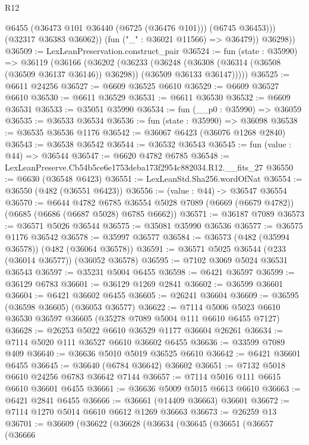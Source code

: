 \begin{lexlean}{R12}
\begin{coremodule}
                @6455
                (@36473 @101 @36440 (@6725 (@36476 @101)))
                (@6745 @36453)))
            (@32317 @36383 @36062))
          (fun ("_" : @36021 @11566) => @36479))
        @36298))
@36509 := LexLeanPreservation.construct_pair
@36524 := fun (state : @35990) =>
  @36119
    (@36166
      (@36202
        (@36233
          (@36248
            (@36308 (@36314 (@36508 (@36509 @36137 @36146)) @36298))
            (@36509 @36133 @36147)))))
@36525 := @6611 @24256
@36527 := @6609 @36525 @6610
@36529 := @6609 @36527 @6610
@36530 := @6611 @36529
@36531 := @6611 @36530
@36532 := @6609 @36531
@36533 := @35051 @35990
@36534 := fun (__p0 : @35990) => @36059
@36535 := @36533 @36534
@36536 := fun (state : @35990) => @36098
@36538 := @36535 @36536 @1176
@36542 := @36067 @6423 (@36076 @1268 @2840)
@36543 := @36538 @36542
@36544 := @36532 @36543
@36545 := fun (value : @44) => @36544
@36547 := @6620 @4782 @6785
@36548 := LexLeanPreserve.Cb54b5ce6e1753deba173f2954c882034.R12.__fits_27
@36550 := @6630 (@36548 @6423)
@36551 := LexLeanStd.Sha256.wordOfNat
@36554 := @36550 (@482 (@36551 @6423))
@36556 := (value : @44) -> @36547 @36554
@36570 := @6644
    @4782
    @6785
    @36554
    @5028
    @7089
    (@6669 (@6679 @4782))
    (@6685 (@6686 (@6687 @5028) @6785 @6662))
@36571 := @36187 @7089
@36573 := @36571 @5026 @36544
@36575 := @35081 @35990 @36536
@36577 := @36575 @1176 @36542
@36578 := @35997 @36577
@36584 := @36573 (@482 (@35994 @36578)) (@482 (@36064 @36578))
@36591 := @36571 @5025 @36544 (@233 (@36014 @36577)) (@36052 @36578)
@36595 := @7102 @3069 @5024 @36531 @36543
@36597 := @35231 @5004 @6455
@36598 := @6421 @36597
@36599 := @36129 @6783
@36601 := @36129 @1269 @2841
@36602 := @36599 @36601
@36604 := @6421 @36602 @6455
@36605 := @26241 @36604
@36609 := @36595 (@36598 @36605) (@36053 @36577)
@36622 := @7114 @5006 @5023 @6610 @36530 @36597 @36605 (@35278 @7089 @5004 @111 @6610 @6455 @7127)
@36628 := @26253 @5022 @6610 @36529 @1177 @36604 @26261
@36634 := @7114 @5020 @111 @36527 @6610 @36602 @6455
@36636 := @33599 @7089 @409
@36640 := @36636 @5010 @5019 @36525 @6610
@36642 := @6421 @36601 @6455
@36645 := @36640 (@6784 @36642) @36602
@36651 := @7132 @5018 @6610 @24256 @6783 @36642 @7144
@36657 := @7114 @5016 @111 @6615 @6610 @36601 @6455
@36661 := @36636 @5009 @5015 @6613 @6610
@36663 := @6421 @2841 @6455
@36666 := @36661 (@14409 @36663) @36601
@36672 := @7114 @1270 @5014 @6610 @6612 @1269 @36663
@36673 := @26259 @13
@36701 := @36609
    (@36622
      (@36628
        (@36634
          (@36645
            (@36651
              (@36657
                (@36666

\end{coremodule}
\end{lexlean}
